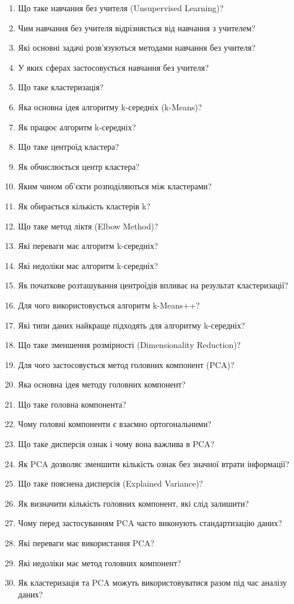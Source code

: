 \begin{enumerate}
\item Що таке навчання без учителя (Unsupervised Learning)?
\item Чим навчання без учителя відрізняється від навчання з учителем?
\item Які основні задачі розв'язуються методами навчання без учителя?
\item У яких сферах застосовується навчання без учителя?
\item Що таке кластеризація?
\item Яка основна ідея алгоритму k-середніх (k-Means)?
\item Як працює алгоритм k-середніх?
\item Що таке центроїд кластера?
\item Як обчислюється центр кластера?
\item Яким чином об'єкти розподіляються між кластерами?
\item Як обирається кількість кластерів k?
\item Що таке метод ліктя (Elbow Method)?
\item Які переваги має алгоритм k-середніх?
\item Які недоліки має алгоритм k-середніх?
\item Як початкове розташування центроїдів впливає на результат кластеризації?
\item Для чого використовується алгоритм k-Means++?
\item Які типи даних найкраще підходять для алгоритму k-середніх?
\item Що таке зменшення розмірності (Dimensionality Reduction)?
\item Для чого застосовується метод головних компонент (PCA)?
\item Яка основна ідея методу головних компонент?
\item Що таке головна компонента?
\item Чому головні компоненти є взаємно ортогональними?
\item Що таке дисперсія ознак і чому вона важлива в PCA?
\item Як PCA дозволяє зменшити кількість ознак без значної втрати інформації?
\item Що таке пояснена дисперсія (Explained Variance)?
\item Як визначити кількість головних компонент, які слід залишити?
\item Чому перед застосуванням PCA часто виконують стандартизацію даних?
\item Які переваги має використання PCA?
\item Які недоліки має метод головних компонент?
\item Як кластеризація та PCA можуть використовуватися разом під час аналізу даних?
\end{enumerate}
